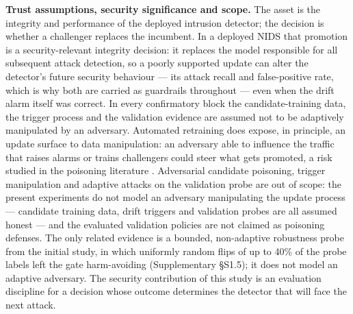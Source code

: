 \documentclass[journal]{IEEEtran}
\begin{document}
\textbf{Trust assumptions, security significance and scope.} The asset is the integrity and performance of the deployed intrusion detector; the decision is whether a challenger replaces the incumbent. In a deployed NIDS that promotion is a security-relevant integrity decision: it replaces the model responsible for all subsequent attack detection, so a poorly supported update can alter the detector's future security behaviour --- its attack recall and false-positive rate, which is why both are carried as guardrails throughout --- even when the drift alarm itself was correct. In every confirmatory block the candidate-training data, the trigger process and the validation evidence are assumed not to be adaptively manipulated by an adversary. Automated retraining does expose, in principle, an update surface to data manipulation: an adversary able to influence the traffic that raises alarms or trains challengers could steer what gets promoted, a risk studied in the poisoning literature \cite{biggio2012poisoning}. Adversarial candidate poisoning, trigger manipulation and adaptive attacks on the validation probe are out of scope: the present experiments do not model an adversary manipulating the update process --- candidate training data, drift triggers and validation probes are all assumed honest --- and the evaluated validation policies are not claimed as poisoning defenses. The only related evidence is a bounded, non-adaptive robustness probe from the initial study, in which uniformly random flips of up to 40\% of the probe labels left the gate harm-avoiding (Supplementary \S S1.5); it does not model an adaptive adversary. The security contribution of this study is an evaluation discipline for a decision whose outcome determines the detector that will face the next attack.
\end{document}
